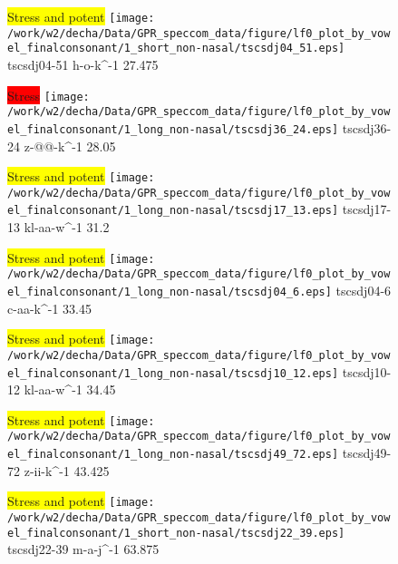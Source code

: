\documentclass{article}
\begin{document}
\begin{figure}[t]
\begin{minipage}[b]{.24\textwidth}
\colorbox{yellow}{Stress and potent}
\centering
\texttt{[image: /work/w2/decha/Data/GPR\_speccom\_data/figure/lf0\_plot\_by\_vowel\_finalconsonant/1\_short\_non-nasal/tscsdj04\_51.eps]}
tscsdj04-51 h-o-k\textasciicircum-1 27.475
\end{minipage}
\begin{minipage}[b]{.24\textwidth}
\colorbox{red}{Stress}
\centering
\texttt{[image: /work/w2/decha/Data/GPR\_speccom\_data/figure/lf0\_plot\_by\_vowel\_finalconsonant/1\_long\_non-nasal/tscsdj36\_24.eps]}
tscsdj36-24 z-@@-k\textasciicircum-1 28.05
\end{minipage}
\begin{minipage}[b]{.24\textwidth}
\colorbox{yellow}{Stress and potent}
\centering
\texttt{[image: /work/w2/decha/Data/GPR\_speccom\_data/figure/lf0\_plot\_by\_vowel\_finalconsonant/1\_long\_non-nasal/tscsdj17\_13.eps]}
tscsdj17-13 kl-aa-w\textasciicircum-1 31.2
\end{minipage}
\begin{minipage}[b]{.24\textwidth}
\colorbox{yellow}{Stress and potent}
\centering
\texttt{[image: /work/w2/decha/Data/GPR\_speccom\_data/figure/lf0\_plot\_by\_vowel\_finalconsonant/1\_long\_non-nasal/tscsdj04\_6.eps]}
tscsdj04-6 c-aa-k\textasciicircum-1 33.45
\end{minipage}
\end{figure}
\clearpage
\begin{figure}[t]
\begin{minipage}[b]{.24\textwidth}
\colorbox{yellow}{Stress and potent}
\centering
\texttt{[image: /work/w2/decha/Data/GPR\_speccom\_data/figure/lf0\_plot\_by\_vowel\_finalconsonant/1\_long\_non-nasal/tscsdj10\_12.eps]}
tscsdj10-12 kl-aa-w\textasciicircum-1 34.45
\end{minipage}
\begin{minipage}[b]{.24\textwidth}
\colorbox{yellow}{Stress and potent}
\centering
\texttt{[image: /work/w2/decha/Data/GPR\_speccom\_data/figure/lf0\_plot\_by\_vowel\_finalconsonant/1\_long\_non-nasal/tscsdj49\_72.eps]}
tscsdj49-72 z-ii-k\textasciicircum-1 43.425
\end{minipage}
\begin{minipage}[b]{.24\textwidth}
\colorbox{yellow}{Stress and potent}
\centering
\texttt{[image: /work/w2/decha/Data/GPR\_speccom\_data/figure/lf0\_plot\_by\_vowel\_finalconsonant/1\_short\_non-nasal/tscsdj22\_39.eps]}
tscsdj22-39 m-a-j\textasciicircum-1 63.875
\end{minipage}
\end{figure}
\end{document}
